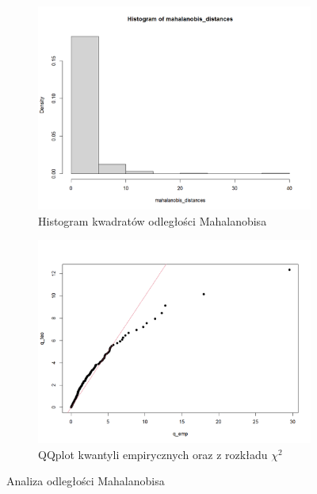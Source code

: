 \documentclass[a4paper,11pt]{article}
\begin{document}
\begin{figure}[!htb]
    \begin{subfigure}{0.45\textwidth}
        \centering
        \includegraphics[width=\linewidth]{mahalanobis_hist.png}
        \caption{Histogram kwadratów odległości Mahalanobisa}
        \label{fig:mahalanobis_hist}
    \end{subfigure}\hfill
    \begin{subfigure}{0.45\textwidth}
        \centering
        \includegraphics[width=\linewidth]{mahalanobis_qqplot.png}
        \caption{QQplot kwantyli empirycznych oraz z rozkładu $\chi^2$}
        \label{fig:mahalanobis_qqplot}
    \end{subfigure}   
    \caption{Analiza odległości Mahalanobisa}
\end{figure}
\end{document}
